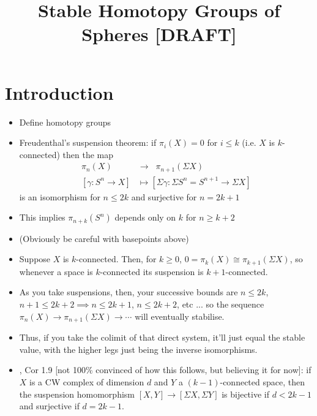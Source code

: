 \documentclass{MetricNotes2023}
\author{\vspace{-5ex}}
\title{Stable Homotopy Groups of Spheres [DRAFT]}
\date{\vspace{-5ex}}
\begin{document}
\maketitle
%

\DeclarePairedDelimiter{\norm}{\lVert}{\rVert} 
\DeclarePairedDelimiter{\abs}{\lvert}{\rvert} 
\DeclarePairedDelimiter{\ang}{\langle}{\rangle} 

\tableofcontents

\pagebreak

\section{Introduction}

\begin{itemize}
\item Define homotopy groups
\item Freudenthal's suspension theorem: if \(\pi_i(X)=0\) for \(i\leq k\) (i.e. \(X\) is \(k\)-connected) then the map 
\begin{align*}
\pi_n(X) \;\;&\to\;\; \pi_{n+1}(\Sigma X)\\
[\gamma : S^n \to X] &\mapsto [\Sigma \gamma : \Sigma S^n=S^{n+1} \to \Sigma X]
\end{align*}
is an isomorphism for \(n \leq 2k\) and surjective for \(n=2k+1\)
\item This implies \(\pi_{n+k}(S^n)\) depends only on \(k\) for \(n\geq k+2\)
\item (Obviously be careful with basepoints above)
\item Suppose \(X\) is \(k\)-connected. Then, for \(k\geq 0\), \(0=\pi_k(X)\cong \pi_{k+1}(\Sigma X)\), so whenever a space is \(k\)-connected its suspension is \(k+1\)-connected. 
\item As you take suspensions, then, your successive bounds are \(n \leq 2k\), \(n+1\leq 2k+2\implies n \leq 2k+1\), \(n\leq 2k+2\), etc ... so the sequence \(\pi_n(X)\to \pi_{n+1}(\Sigma X)\to \cdots\) will eventually stabilise.  
\item Thus, if you take the colimit of that direct system, it'll just equal the stable value, with the higher legs just being the inverse isomorphisms.
\item \autocite{ass}, Cor 1.9 [not 100\% convinced of how this follows, but believing it for now]: if \(X\) is a CW complex of dimension \(d\) and \(Y\) a \((k-1)\)-connected space, then the suspension homomorphism \([X, Y]\to[\Sigma X, \Sigma Y]\) is bijective if \(d<2k-1\) and surjective if \(d=2k-1\). 
\end{itemize}
\end{document}
